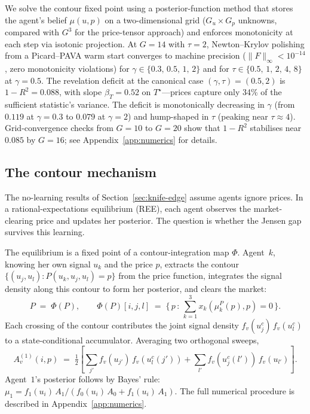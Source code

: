 \documentclass[12pt,letterpaper]{article}
\theoremstyle{definition}
\theoremstyle{remark}
\newcommand{\Tstar}{T^{\!\star}}
\newcommand{\1}{\mathbf{1}}
\begin{document}
We solve the contour fixed point using a posterior-function method
that stores the agent's belief $\mu(u,p)$ on a two-dimensional grid
($G_{u}\!\times\!G_{p}$ unknowns, compared with $G^{3}$ for the
price-tensor approach) and enforces monotonicity at each step
via isotonic projection. At $G\!=\!14$ with
$\tau\!=\!2$, Newton--Krylov polishing from a Picard--PAVA warm start
converges to machine precision
($\|F\|_{\infty}\!<\!10^{-14}$, zero monotonicity violations) for
$\gamma\!\in\!\{0.3,\,0.5,\,1,\,2\}$ and for
$\tau\!\in\!\{0.5,\,1,\,2,\,4,\,8\}$ at $\gamma\!=\!0.5$. The
revelation deficit at the canonical case $(\gamma,\tau)\!=\!(0.5,2)$
is $1\!-\!R^{2}\!=\!0.088$, with slope $\beta_{T}\!=\!0.52$ on
$\Tstar$---prices capture only 34\% of the sufficient statistic's
variance. The deficit is monotonically decreasing in $\gamma$
(from $0.119$ at $\gamma\!=\!0.3$ to $0.079$ at $\gamma\!=\!2$)
and hump-shaped in $\tau$ (peaking near $\tau\!\approx\!4$).
Grid-convergence checks from $G\!=\!10$ to $G\!=\!20$ show that
$1\!-\!R^{2}$ stabilises near $0.085$ by $G\!=\!16$; see
Appendix~\ref{app:numerics} for details.

\subsection{The contour mechanism}\label{sec:contour-mechanism}

The no-learning results of Section~\ref{sec:knife-edge} assume agents
ignore prices. In a rational-expectations equilibrium (REE), each agent
observes the market-clearing price and updates her posterior. The
question is whether the Jensen gap survives this learning.

The equilibrium is a fixed point of a contour-integration map
$\Phi$. Agent~$k$, knowing her own signal $u_k$ and the price $p$,
extracts the contour $\{(u_j,u_l): P(u_k,u_j,u_l)=p\}$ from the
price function, integrates the signal density along this contour to
form her posterior, and clears the market:
\begin{equation}
   P \;=\; \Phi(P), \qquad
   \Phi(P)[i,j,l] \;=\;
   \bigl\{\,p\,:\,\textstyle\sum_{k=1}^{3} x_{k}(\mu_{k}^{P}(p),p)=0\,\bigr\}.
\label{eq:fixed-point}
\end{equation}
Each crossing of the contour contributes the joint signal density
$f_{v}(u_{j}^{c})\,f_{v}(u_{l}^{c})$ to a state-conditional accumulator.
Averaging two orthogonal sweeps,
\begin{equation}
   A_{v}^{(1)}(i,p) \;=\;
   \tfrac12 \!\left[\sum_{j'} f_{v}(u_{j'})\,f_{v}(u_{l}^{c}(j'))
                 + \sum_{l'} f_{v}(u_{j}^{c}(l'))\,f_{v}(u_{l'})\right].
\label{eq:contour-integral}
\end{equation}
Agent~$1$'s posterior follows by Bayes' rule:
$\mu_{1} = f_{1}(u_{i})\,A_{1} / (f_{0}(u_{i})\,A_{0} + f_{1}(u_{i})\,A_{1})$.
\label{eq:contour-bayes}
The full numerical procedure is described in
Appendix~\ref{app:numerics}.
\end{document}
